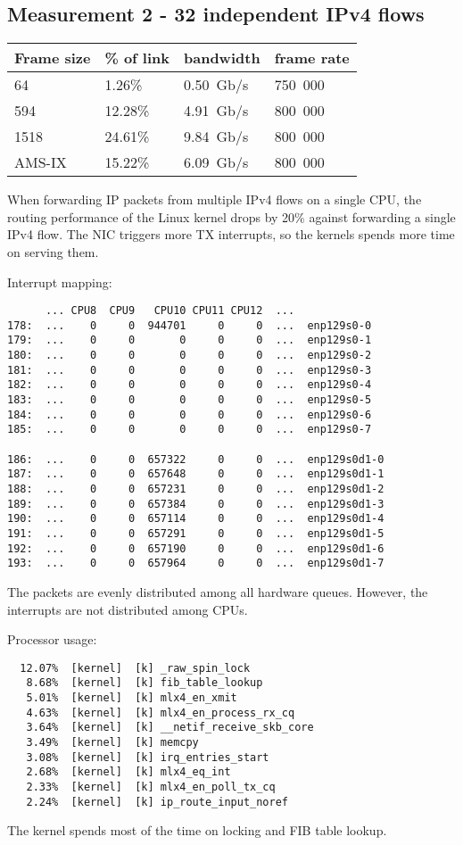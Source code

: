 
\subsection{Measurement 2 - 32 independent IPv4 flows}
\begin{tabular}{ | l | l | l | l | }
\hline
Frame size & \% of link & bandwidth & frame rate \\
\hline
64     &  1.26\% &  0.50~Gb/s & 750~000 \\
594    & 12.28\% &  4.91~Gb/s & 800~000 \\
1518   & 24.61\% &  9.84~Gb/s & 800~000 \\
AMS-IX & 15.22\% &  6.09~Gb/s & 800~000 \\
\hline
\end{tabular}
When forwarding IP packets from multiple IPv4 flows on a single CPU,
the routing performance of the Linux kernel drops by 20\% against forwarding a single IPv4 flow.
The NIC triggers more TX interrupts, so the kernels spends more time on serving them.

Interrupt mapping:
\begin{lstlisting}
      ... CPU8  CPU9   CPU10 CPU11 CPU12  ...
178:  ...    0     0  944701     0     0  ...  enp129s0-0
179:  ...    0     0       0     0     0  ...  enp129s0-1
180:  ...    0     0       0     0     0  ...  enp129s0-2
181:  ...    0     0       0     0     0  ...  enp129s0-3
182:  ...    0     0       0     0     0  ...  enp129s0-4
183:  ...    0     0       0     0     0  ...  enp129s0-5
184:  ...    0     0       0     0     0  ...  enp129s0-6
185:  ...    0     0       0     0     0  ...  enp129s0-7

186:  ...    0     0  657322     0     0  ...  enp129s0d1-0
187:  ...    0     0  657648     0     0  ...  enp129s0d1-1
188:  ...    0     0  657231     0     0  ...  enp129s0d1-2
189:  ...    0     0  657384     0     0  ...  enp129s0d1-3
190:  ...    0     0  657114     0     0  ...  enp129s0d1-4
191:  ...    0     0  657291     0     0  ...  enp129s0d1-5
192:  ...    0     0  657190     0     0  ...  enp129s0d1-6
193:  ...    0     0  657964     0     0  ...  enp129s0d1-7
\end{lstlisting}
The packets are evenly distributed among all hardware queues.
However, the interrupts are not distributed among CPUs.

Processor usage:
\begin{lstlisting}
  12.07%  [kernel]  [k] _raw_spin_lock
   8.68%  [kernel]  [k] fib_table_lookup
   5.01%  [kernel]  [k] mlx4_en_xmit
   4.63%  [kernel]  [k] mlx4_en_process_rx_cq
   3.64%  [kernel]  [k] __netif_receive_skb_core
   3.49%  [kernel]  [k] memcpy
   3.08%  [kernel]  [k] irq_entries_start
   2.68%  [kernel]  [k] mlx4_eq_int
   2.33%  [kernel]  [k] mlx4_en_poll_tx_cq
   2.24%  [kernel]  [k] ip_route_input_noref
\end{lstlisting}
The kernel spends most of the time on locking and FIB table lookup. 
